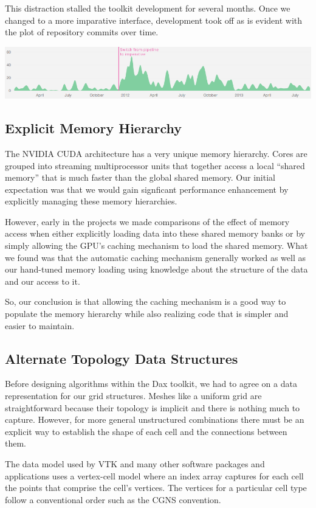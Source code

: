 This distraction stalled the toolkit development for several months. Once
we changed to a more imparative interface, development took off as is
evident with the plot of repository commits over time.

\noindent
\includegraphics[width=\textwidth]{images/GitActivity}

\subsection{Explicit Memory Hierarchy}

The NVIDIA CUDA architecture has a very unique memory hierarchy. Cores are
grouped into streaming multiprocessor units that together access a local
``shared memory'' that is much faster than the global shared memory. Our
initial expectation was that we would gain signficant performance
enhancement by explicitly managing these memory hierarchies.

However, early in the projects we made comparisons of the effect of memory
access when either explicitly loading data into these shared memory banks
or by simply allowing the GPU's caching mechanism to load the shared
memory. What we found was that the automatic caching mechanism generally
worked as well as our hand-tuned memory loading using knowledge about the
structure of the data and our access to it.

So, our conclusion is that allowing the caching mechanism is a good way to
populate the memory hierarchy while also realizing code that is simpler and
easier to maintain.

\subsection{Alternate Topology Data Structures}

Before designing algorithms within the Dax toolkit, we had to agree on a
data representation for our grid structures. Meshes like a uniform grid are
straightforward because their topology is implicit and there is nothing
much to capture. However, for more general unstructured combinations there
must be an explicit way to establish the shape of each cell and the
connections between them.

The data model used by VTK and many other software packages and
applications uses a vertex-cell model where an index array captures for
each cell the points that comprise the cell's vertices. The vertices for a
particular cell type follow a conventional order such as the CGNS
convention.

